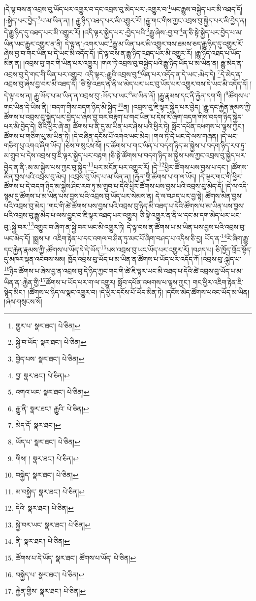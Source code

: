 །དེ་ལྟ་བས་ན་འབྲས་བུ་ཡོད་པར་འགྱུར་བ་དང་འབྲས་བུ་མེད་པར་:འགྱུར་བ་\footnote{གྱུར་པ་  སྣར་ཐང་།  པེ་ཅིན། }ཡང་རྒྱུས་བསྐྱེད་པར་མི་འཐད་དོ། །:སྐྱེད་པར་བྱེད་\footnote{སྐྱེ་བ་ཡོད་  སྣར་ཐང་།  པེ་ཅིན། }པ་མ་ཡིན་ན། །
རྒྱུ་ཉིད་འཐད་པར་མི་འགྱུར་རོ། །རྒྱུ་གང་གིས་ཀྱང་འབྲས་བུ་སྐྱེད་པར་མི་བྱེད་ན། དེ་རྒྱུ་ཉིད་དུ་འཐད་པར་མི་འགྱུར་རོ། །འདི་ལྟར་སྐྱེད་པར་:བྱེད་པའི་\footnote{བྱེད་པས་  སྣར་ཐང་།  པེ་ཅིན། }རྒྱུ་ཞེས་:བྱ་བ་\footnote{བྱ་  སྣར་ཐང་།  པེ་ཅིན། }ན་ཅི་སྟེ་སྐྱེད་པར་བྱེད་པ་མ་ཡིན་ཡང་རྒྱུར་འགྱུར་ན་ནི། དེ་ལྟ་ན་:འགར་ཡང་\footnote{འགའ་ཡང་  སྣར་ཐང་།  པེ་ཅིན། }རྒྱུ་མ་ཡིན་པར་མི་འགྱུར་བས་ཐམས་ཅད་རྒྱུ་ཉིད་དུ་འགྱུར་རོ་ཞེས་བྱ་བ་གང་ཡིན་པ་དེ་ཡང་མི་འདོད་དོ། །དེ་ལྟ་བས་ན་རྒྱུ་ཉིད་འཐད་པར་མི་འགྱུར་རོ། །རྒྱུ་ཉིད་འཐད་པ་ཡོད་མིན་ན། །འབྲས་བུ་གང་གི་ཡིན་པར་འགྱུར། །གལ་ཏེ་འབྲས་བུ་བསྐྱེད་པའི་རྒྱུ་ཉིད་ཡོད་པ་མ་ཡིན་ན། རྒྱུ་མེད་ན་འབྲས་བུ་དེ་གང་གི་ཡིན་པར་འགྱུར། འདི་ལྟར་:རྒྱུའི་འབྲས་བུ་\footnote{རྒྱུ་ནི་  སྣར་ཐང་། རྒྱུའི་  པེ་ཅིན། }ཡིན་པར་འདོད་ན་དེ་ཡང་:མེད་དེ། \footnote{མེད་དོ་  སྣར་ཐང་། }དེ་མེད་ན་འབྲས་བུ་ཞེས་བྱ་བར་མི་འཐད་དོ། །ཅི་སྟེ་འཐད་ན་ནི་ཕ་མེད་པར་ཡང་བུ་ཡོད་པར་འགྱུར་བས་དེ་ཡང་མི་འདོད་དོ། །དེ་ལྟ་བས་ན། རྒྱུ་ཡོད་པ་མ་ཡིན་ན་འབྲས་བུ་:ཡོད་པ་ཡང་\footnote{ཡོད་པ་  སྣར་ཐང་།  པེ་ཅིན། }མ་ཡིན་ནོ། །རྒྱུ་རྣམས་དང་ནི་རྐྱེན་དག་གི །\footnote{གིས། །  སྣར་ཐང་།  པེ་ཅིན། }ཚོགས་པ་གང་ཡིན་དེ་ཡིས་ནི། །བདག་གིས་བདག་ཉིད་མི་སྐྱེད་\footnote{བསྐྱེད་  སྣར་ཐང་།  པེ་ཅིན། }ན། །འབྲས་བུ་ཇི་ལྟར་སྐྱེད་པར་བྱེད། །རྒྱུ་དང་རྐྱེན་རྣམས་ཀྱི་ཚོགས་པ་འབྲས་བུ་སྐྱེད་པར་བྱེད་པ་ཞེས་བྱ་བར་བརྟག་པ་གང་ཡིན་པ་དེས་རེ་ཞིག་བདག་གིས་བདག་ཉིད་སྐྱེད་པར་མི་བྱེད་དེ། ཅིའི་ཕྱིར་ཞེ་ན། ཚོགས་པ་ནི་དུ་མ་ཡིན་པར་ཤེས་པའི་ཕྱིར་ཏེ། སློབ་དཔོན་འཕགས་པ་ལྷས་ཀྱང་། ཚོགས་པ་གཅིག་པུ་མ་ཡིན་ཏེ། །དེ་བཞིན་དངོས་པོ་འགའ་ཡང་མེད། །གལ་ཏེ་དེ་ཡང་དེ་ལས་གཞན། །དེ་ཡང་གཅིག་པུ་འགའ་ཞིག་ཡོད། །ཅེས་གསུངས་སོ། །ད་ཚོགས་པ་གང་ཡིན་པ་བདག་ཉིད་མ་སྐྱེས་པ་བདག་ཉིད་རབ་ཏུ་མ་གྲུབ་པ་དེས་འབྲས་བུ་ཇི་ལྟར་སྐྱེད་པར་བརྟག །ཅི་སྟེ་ཚོགས་པ་བདག་ཉིད་མ་སྐྱེས་པས་ཀྱང་འབྲས་བུ་སྐྱེད་པར་བྱེད་ན་ནི་:མ་མ་སྐྱེས་པས་ཀྱང་བུ་སྐྱེད་\footnote{མ་བསྐྱེད་  སྣར་ཐང་།  པེ་ཅིན། }པར་མངོན་པར་འགྱུར་རོ། །དེ་\footnote{དེའི་  སྣར་ཐང་།  པེ་ཅིན། }ཕྱིར་ཚོགས་པས་བྱས་པ་དང་། །ཚོགས་མིན་བྱས་པའི་འབྲས་བུ་མེད། །འབྲས་བུ་ཡོད་པ་མ་ཡིན་ན། །རྐྱེན་གྱི་ཚོགས་པ་ག་ལ་ཡོད། །དེ་ལྟར་གང་གི་ཕྱིར་ཚོགས་པ་དེ་བདག་ཉིད་མ་སྐྱེས་ཤིང་རབ་ཏུ་མ་གྲུབ་པ་དེའི་ཕྱིར་ཚོགས་པས་བྱས་པའི་འབྲས་བུ་མེད་དོ། །དེ་ལ་འདི་སྙམ་དུ་ཚོགས་པ་མ་ཡིན་པས་བྱས་པའི་འབྲས་བུ་ཡོད་པར་སེམས་ན། དེ་ལ་བཤད་པར་བྱ་སྟེ། ཚོགས་མིན་བྱས་པའི་འབྲས་བུ་མེད། །གང་གི་ཚེ་ཚོགས་པས་བྱས་པའི་འབྲས་བུ་ཉིད་མི་འཐད་པ་དེའི་ཚོགས་པ་མ་ཡིན་པས་བྱས་པའི་འབྲས་བུ་རྒྱུ་མེད་པ་ལས་བྱུང་བ་ཇི་ལྟར་འཐད་པར་འགྱུར། ཅི་སྟེ་འགྱུར་ན་ནི་ཕ་དང་མ་དག་མེད་པར་ཡང་བུ་:སྐྱེ་བར་\footnote{སྐྱེ་བར་ཡང་  སྣར་ཐང་།  པེ་ཅིན། }འགྱུར་བ་ཞིག་ན་སྐྱེ་བར་ཡང་མི་འགྱུར་ཏེ། དེ་ལྟ་བས་ན་ཚོགས་པ་མ་ཡིན་པས་བྱས་པའི་འབྲས་བུ་ཡང་མེད་དོ། །སྨྲས་པ། འཇིག་རྟེན་པ་དང་འགལ་བ་ཤིན་ཏུ་མང་པོ་ཞིག་བཤད་པ་འདིས་ཅི་བྱ། ཡོད་ན་\footnote{ནི་  སྣར་ཐང་།  པེ་ཅིན། }རེ་ཞིག་རྒྱུ་དང་རྐྱེན་རྣམས་ཀྱི་:ཚོགས་པ་ཡོད་དེ་དེ་ཡོད་\footnote{ཚོགས་པ་དེ་ཡོད་  སྣར་ཐང་། ཚོགས་པ་ཡོད་  པེ་ཅིན། }པས་འབྲས་བུ་ཡང་ཡོད་པར་འགྱུར་རོ། །བཤད་པ། ཅི་ཁྱོད་གྲོང་སྟོད་དུ་མཁར་ལྡན་འབེབས་སམ། ཁྱོད་འབྲས་བུ་ཡོད་པ་མ་ཡིན་ན་ཚོགས་པ་ཡོད་པར་འདོད་ཀོ །འབྲས་བུ་:སྐྱེད་པ་\footnote{བསྐྱེད་པ་  སྣར་ཐང་།  པེ་ཅིན། }ཉིད་ཚོགས་པ་ཞེས་བྱ་ན་འབྲས་བུ་དེ་ཉིད་ཀྱང་གང་གི་ཚེ་ཇི་ལྟར་ཡང་མི་འཐད་པ་དེའི་ཚེ་འབྲས་བུ་ཡོད་པ་མ་ཡིན་ན་:རྐྱེན་གྱི་\footnote{རྐྱེན་གྱིས་  སྣར་ཐང་།  པེ་ཅིན། }ཚོགས་པ་ཡོད་པར་ག་ལ་འགྱུར། སློབ་དཔོན་འཕགས་པ་ལྷས་ཀྱང་། གང་ཕྱིར་འཇིག་རྟེན་ཇི་སྙེད་མིང་། །ཚོགས་པ་ཉིད་ལ་སྣང་འགྱུར་བ། །དེ་ཕྱིར་དངོས་པོ་ཡོད་མིན་ཏེ། །དངོས་མེད་ཚོགས་པའང་ཡོད་མ་ཡིན། །ཞེས་གསུངས་སོ། 